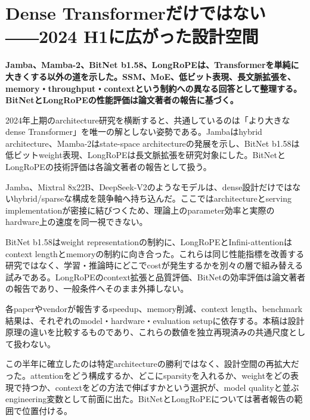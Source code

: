 \section{Dense Transformerだけではない――2024 H1に広がった設計空間}
\noindent\textbf{Jamba、Mamba-2、BitNet b1.58、LongRoPEは、Transformerを単純に大きくする以外の道を示した。SSM、MoE、低ビット表現、長文脈拡張を、memory・throughput・contextという制約への異なる回答として整理する。BitNetとLongRoPEの性能評価は論文著者の報告に基づく。}\autocite{src-0cba3ed32188,src-b5fbfc0d43e4,src-e0e69bb00ff7,src-fb3cf48135e8}

2024年上期のarchitecture研究を横断すると、共通しているのは「より大きなdense Transformer」を唯一の解としない姿勢である。Jambaはhybrid architecture、Mamba-2はstate-space architectureの発展を示し、BitNet b1.58は低ビットweight表現、LongRoPEは長文脈拡張を研究対象にした。BitNetとLongRoPEの技術評価は各論文著者の報告として扱う。\autocite{src-0cba3ed32188,src-b5fbfc0d43e4,src-e0e69bb00ff7,src-fb3cf48135e8}


Jamba、Mixtral 8x22B、DeepSeek-V2のようなモデルは、dense設計だけではないhybrid/sparseな構成を競争軸へ持ち込んだ。ここではarchitectureとserving implementationが密接に結びつくため、理論上のparameter効率と実際のhardware上の速度を同一視できない。\autocite{src-05f98c47f3e8,src-b5fbfc0d43e4,src-d9d69089eb6a}


BitNet b1.58はweight representationの制約に、LongRoPEとInfini-attentionはcontext lengthとmemoryの制約に向き合った。これらは同じ性能指標を改善する研究ではなく、学習・推論時にどこでcostが発生するかを別々の層で組み替える試みである。LongRoPEのcontext拡張と品質評価、BitNetの効率評価は論文著者の報告であり、一般条件へそのまま外挿しない。\autocite{src-2eb2353f0533,src-e0e69bb00ff7,src-fb3cf48135e8}


\begin{claimboundary}
各paperやvendorが報告するspeedup、memory削減、context length、benchmark結果は、それぞれのmodel・hardware・evaluation setupに依存する。本稿は設計原理の違いを比較するものであり、これらの数値を独立再現済みの共通尺度として扱わない。\autocite{src-0cba3ed32188,src-b5fbfc0d43e4,src-e0e69bb00ff7,src-fb3cf48135e8}
\end{claimboundary}

この半年に確立したのは特定architectureの勝利ではなく、設計空間の再拡大だった。attentionをどう構成するか、どこにsparsityを入れるか、weightをどの表現で持つか、contextをどの方法で伸ばすかという選択が、model qualityと並ぶengineering変数として前面に出た。BitNetとLongRoPEについては著者報告の範囲で位置付ける。\autocite{src-05f98c47f3e8,src-0cba3ed32188,src-b5fbfc0d43e4,src-d9d69089eb6a,src-e0e69bb00ff7,src-fb3cf48135e8}
